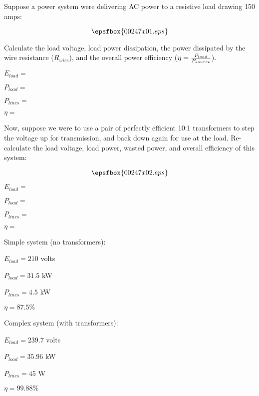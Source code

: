 

Suppose a power system were delivering AC power to a resistive load drawing 150 amps:

$$\epsfbox{00247x01.eps}$$

Calculate the load voltage, load power dissipation, the power dissipated by the wire resistance ($R_{wire}$), and the overall power efficiency ($\eta = {P_{load} \over P_{source}}$).

\medskip
\item {} $E_{load} = $ 
\item {} $P_{load} = $ 
\item {} $P_{lines} = $ 
\item {} $\eta = $ 
\bigskip

Now, suppose we were to use a pair of perfectly efficient 10:1 transformers to step the voltage up for transmission, and back down again for use at the load.  Re-calculate the load voltage, load power, wasted power, and overall efficiency of this system:

$$\epsfbox{00247x02.eps}$$

\medskip
\item {} $E_{load} = $ 
\item {} $P_{load} = $ 
\item {} $P_{lines} = $ 
\item {} $\eta = $ 
\medskip







Simple system (no transformers):

\medskip
\item {} $E_{load} = 210$ volts
\item {} $P_{load} = 31.5$ kW
\item {} $P_{lines} = 4.5$ kW
\item {} $\eta = 87.5 \%$ 
\bigskip

Complex system (with transformers):

\medskip
\item {} $E_{load} = 239.7$ volts
\item {} $P_{load} = 35.96$ kW
\item {} $P_{lines} = 45$ W
\item {} $\eta = 99.88 \%$ 
\medskip

